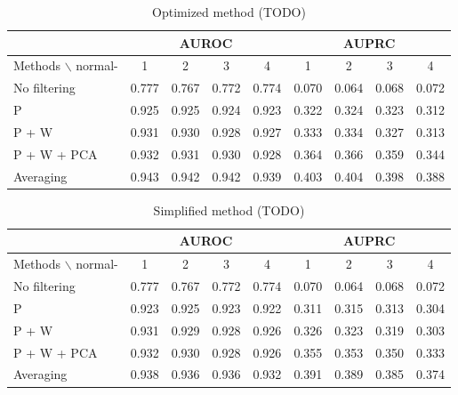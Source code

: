 \documentclass[wcp]{jmlr}
\begin{document}


\begin{table}[tbh]
\centering
\small
\begin{tabular}{@{}l *{8}{c}@{}}
\hline
  & \multicolumn{4}{c}{AUROC} & \multicolumn{4}{c}{AUPRC} \\
\hline
Methods $\backslash$ normal- & 1 & 2 & 3 & 4 & 1 & 2 & 3 & 4 \\
No  filtering       & 0.777 & 0.767 & 0.772 & 0.774 & 0.070 & 0.064 & 0.068 & 0.072\\
P                   & 0.925 & 0.925 & 0.924 & 0.923 & 0.322 & 0.324 & 0.323 & 0.312\\
P + W               & 0.931 & 0.930 & 0.928 & 0.927 & 0.333 & 0.334 & 0.327 & 0.313\\
P + W + PCA         & 0.932 & 0.931 & 0.930 & 0.928 & 0.364 & 0.366 & 0.359 & 0.344\\
Averaging           & 0.943 & 0.942 & 0.942 & 0.939 & 0.403 & 0.404 & 0.398 & 0.388\\
\end{tabular}
\caption{Optimized method (TODO)}
\label{tab:tab3}
\end{table}


\begin{table}[tbh]
\centering
\small
\begin{tabular}{@{}l *{8}{c}@{}}
\hline
  & \multicolumn{4}{c}{AUROC} & \multicolumn{4}{c}{AUPRC} \\
\hline
Methods $\backslash$ normal- & 1 & 2 & 3 & 4 & 1 & 2 & 3 & 4 \\
No  filtering       & 0.777 & 0.767 & 0.772 & 0.774 & 0.070 & 0.064 & 0.068 & 0.072\\
P                   & 0.923 & 0.925 & 0.923 & 0.922 & 0.311 & 0.315 & 0.313 & 0.304\\
P + W               & 0.931 & 0.929 & 0.928 & 0.926 & 0.326 & 0.323 & 0.319 & 0.303\\
P + W + PCA         & 0.932 & 0.930 & 0.928 & 0.926 & 0.355 & 0.353 & 0.350 & 0.333\\
Averaging           & 0.938 & 0.936 & 0.936 & 0.932 & 0.391 & 0.389 & 0.385 & 0.374\\
\end{tabular}
\caption{Simplified method (TODO)}
\label{tab:tab3}
\end{table}

\end{document}
